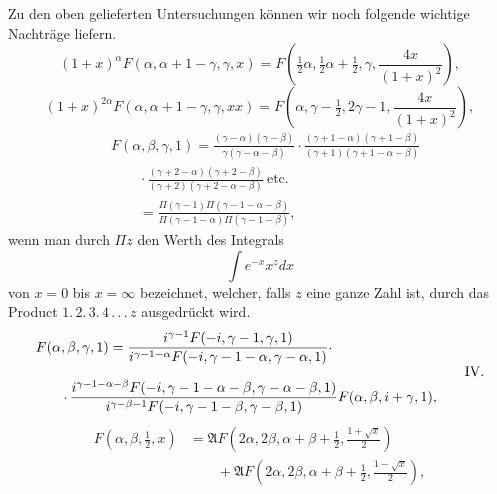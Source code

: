 \begingroup
\makeatletter\tagsleft@true\let\veqno\@@leqno\makeatother
{}
\noindent{\small[S. 67]}\par
\indent Zu den oben gelieferten Untersuchungen können wir noch folgende wichtige Nachträge liefern.
\begin{equation}
(1+x)^\alpha F(\alpha,\alpha+1-\gamma,\gamma,x)=F\left(\tfrac12\alpha,\tfrac12\alpha+\tfrac12,\gamma,\frac{4x}{(1+x)^2}\right),\tag*{I.}
\end{equation}
\begin{equation}
(1+x)^{2\alpha}F(\alpha,\alpha+1-\gamma,\gamma,xx)=F\left(\alpha,\gamma-\tfrac12,2\gamma-1,\frac{4x}{(1+x)^2}\right),\tag*{II.}
\end{equation}
\begin{equation}
\begin{aligned}
&F(\alpha,\beta,\gamma,1)=\frac{(\gamma-\alpha)(\gamma-\beta)}{\gamma(\gamma-\alpha-\beta)}\cdot\frac{(\gamma+1-\alpha)(\gamma+1-\beta)}{(\gamma+1)(\gamma+1-\alpha-\beta)}\\[.7em]
&\qquad\cdot\frac{(\gamma+2-\alpha)(\gamma+2-\beta)}{(\gamma+2)(\gamma+2-\alpha-\beta)}\ \mathrm{etc.}\\[.7em]
&\qquad=\frac{\Pi(\gamma-1)\Pi(\gamma-1-\alpha-\beta)}{\Pi(\gamma-1-\alpha)\Pi(\gamma-1-\beta)},
\end{aligned}\tag*{III.}
\end{equation}
\noindent wenn man durch $\Pi z$ den Werth des Integrals
\[\int e^{-x}x^z dx\]
\noindent von $x=0$ bis $x=\infty$ bezeichnet, welcher, falls $z$ eine ganze Zahl ist, durch das Product $1{.}\,2{.}\,3{.}\,4\,{.}\,{.}\,{.}\,z$ ausgedrückt wird.
\begin{equation}
\begin{aligned}
&F(\alpha,\beta,\gamma,1)=\frac{i^{\gamma-1}F(-i,\gamma-1,\gamma,1)}{i^{\gamma-1-\alpha}F(-i,\gamma-1-\alpha,\gamma-\alpha,1)}\mathpunct{\raisebox{.35ex}{.}}\\[.7em]
&\qquad\mathpunct{\raisebox{.35ex}{.}}\frac{i^{\gamma-1-\alpha-\beta}F(-i,\gamma-1-\alpha-\beta,\gamma-\alpha-\beta,1)}{i^{\gamma-\beta-1}F(-i,\gamma-1-\beta,\gamma-\beta,1)}F(\alpha,\beta,i+\gamma,1),
\end{aligned}\tag*{IV.}
\end{equation}
\begin{equation}
\begin{aligned}
F\left(\alpha,\beta,\tfrac12,x\right)&=\mathfrak{A}F\left(2\alpha,2\beta,\alpha+\beta+\tfrac12,\frac{1+\surd x}{2}\right)\\[.7em]
&\qquad+\mathfrak{A}F\left(2\alpha,2\beta,\alpha+\beta+\tfrac12,\frac{1-\surd x}{2}\right),
\end{aligned}\tag*{V.}
\end{equation}
